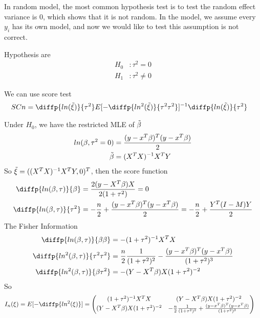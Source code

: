 \documentclass[11pt]{article} %
\begin{document}
In random model, the most common hypothesis test is to test the random effect variance is 0, which shows that it is not random. In the model, we assume every $y_i$ has its own model, and now we would like to test this assumption is not correct. 

Hypothesis are
\begin{align*}
	H_0 &: \tau^2 = 0  \\
	H_1 &: \tau^2 \neq 0
\end{align*}

We can use score test
\begin{align*}
	SCn & = \diffp{ln(\Tilde{\xi})}{{\tau^2}} E[-\diffp{ln^2(\Tilde{\xi})}{{\tau^2}{\tau^2}}]^{-1} \diffp{ln(\Tilde{\xi})}{{\tau^2}} 
\end{align*}

Under $H_0$, we have the restricted MLE of $\Tilde{\beta}$
\begin{align*}
	ln(\beta, \tau^2 = 0) & = \frac{(y-x^T \beta)^T (y-x^T \beta)}{2}\\
	\Tilde{\beta} &= (X^T X)^{-1} X^T Y
\end{align*}
So $\Tilde{\xi} = ((X^T X)^{-1} X^T Y, 0)^T$, then the score function
\begin{align*}
	\diffp{ln(\beta, \tau)}{\beta} &= \frac{2 (y-X^T \beta) X}{2 (1+\tau^2)} = 0\\
	\diffp{ln(\beta, \tau)}{{\tau^2}} &= -\frac{n}{2}  + \frac{ (y-x^T \beta)^T (y-x^T \beta)}{2 } = -\frac{n}{2}  + \frac{Y^T (I-M) Y}{2}
\end{align*}
The Fisher Information
\begin{align*}
	\diffp{ln(\beta, \tau)}{\beta \beta} &= - (1+ \tau^2)^{-1} X^T X \\
	\diffp{ln^2(\beta, \tau)}{{\tau^2} {\tau^2}} &= \frac{n}{2} \frac{1}{(1+\tau^2)^2} - \frac{(y-x^T \beta)^T (y-x^T \beta)}{(1+\tau^2)^3}  \\
	\diffp{ln^2(\beta, \tau)}{{\beta} {\tau^2}} & = -(Y- X^T \beta) X (1+ \tau^2)^{-2}\\
\end{align*}
So 
\begin{align*}
	I_n({\xi}) &= E[-\diffp{ln^2({\xi})}] = \begin{pmatrix*}
		(1+ \tau^2)^{-1} X^T X  &  (Y- X^T \beta) X (1+ \tau^2)^{-2}\\
		(Y- X^T \beta) X (1+ \tau^2)^{-2} & -\frac{n}{2} \frac{1}{(1+\tau^2)^2} + \frac{(y-x^T \beta)^T (y-x^T \beta)}{(1+\tau^2)^3} 
	\end{pmatrix*}
\end{align*}
\end{document}
